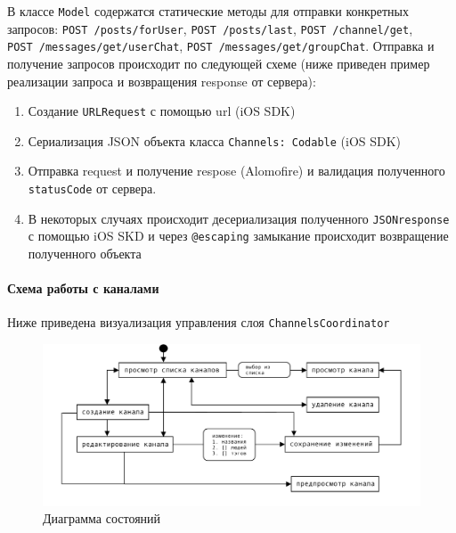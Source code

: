 \documentclass[a4paper,12pt]{article}
\begin{document}
	В классе \verb|Model| содержатся статические методы для отправки конкретных запросов: \verb|POST /posts/forUser|, \verb|POST /posts/last|, \verb|POST /channel/get|,\\ \verb|POST /messages/get/userChat|, \verb|POST /messages/get/groupChat|. Отправка и получение запросов происходит по следующей схеме (ниже приведен пример реализации запроса и возвращения response от сервера):
	
	
	\begin{enumerate}
		\item Создание \verb|URLRequest| с помощью url (iOS SDK)
		\item Сериализация JSON объекта класса \verb|Channels: Codable| (iOS SDK)
		\item Отправка request и получение respose (Alomofire) и валидация полученного \verb|statusCode| от сервера. 
		\item В некоторых случаях происходит десериализация полученного \verb|JSONresponse| с помощью iOS SKD и через \verb|@escaping| замыкание происходит возвращение полученного объекта
	\end{enumerate}
	\paragraph{Схема работы с каналами\\}
	Ниже приведена визуализация управления слоя \verb|ChannelsCoordinator|
	\begin{figure}[h!]
		\centering
		\includegraphics[width = \linewidth]{../includes/illustrations/channelsFlow.pdf}
		\caption{Диаграмма состояний}
		\label{pic: channel}
	\end{figure}
\end{document}
